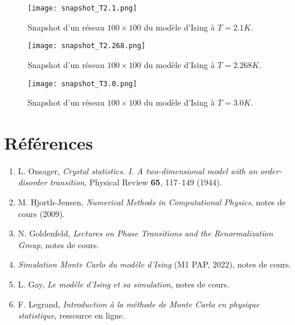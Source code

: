 \documentclass[a4paper,11pt]{article}
\begin{document}
\begin{figure}[H]
    \centering
    \texttt{[image: snapshot\_T2.1.png]}
    \caption{Snapshot d’un réseau $100 \times 100$ du modèle d’Ising à $T = 2.1K$.}
    \label{fig:snapshot_T2.1}
\end{figure}

\begin{figure}[H]
    \centering
    \texttt{[image: snapshot\_T2.268.png]}
    \caption{Snapshot d’un réseau $100 \times 100$ du modèle d’Ising à $T = 2.268K$.}
    \label{fig:snapshot_T2.268}
\end{figure}

\begin{figure}[H]
    \centering
    \texttt{[image: snapshot\_T3.0.png]}
    \caption{Snapshot d’un réseau $100 \times 100$ du modèle d’Ising à $T = 3.0K$.}
    \label{fig:snapshot_T3.0}
\end{figure}


\section*{Références}

\begin{enumerate}
  \item L. Onsager, \textit{Crystal statistics. I. A two-dimensional model with an order-disorder transition}, Physical Review \textbf{65}, 117–149 (1944). 
  \item M. Hjorth-Jensen, \textit{Numerical Methods in Computational Physics}, notes de cours (2009).
  \item N. Goldenfeld, \textit{Lectures on Phase Transitions and the Renormalization Group}, notes de cours.
  \item \textit{Simulation Monte Carlo du modèle d’Ising} (M1 PAP, 2022), notes de cours.
  \item L. Gay, \textit{Le modèle d’Ising et sa simulation}, notes de cours. 
  \item F. Legrand, \textit{Introduction à la méthode de Monte Carlo en physique statistique}, ressource en ligne. 
\end{enumerate}
\end{document}
